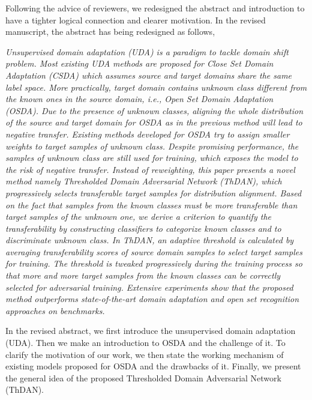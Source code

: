 Following the advice of reviewers, we redesigned the abstract and introduction to have a tighter logical connection and clearer motivation.
In the revised manuscript, the abstract has being redesigned as follows,
\begin{siderules}
    \textit{
        \footnotesize
        Unsupervised domain adaptation (UDA) is a paradigm to tackle domain shift problem.
        Most existing UDA methods are proposed for Close Set Domain Adaptation (\textit{CSDA}) which assumes source and target domains share the same label space.
        More practically, target domain contains unknown class different from the known ones in the source domain, i.e., Open Set Domain Adaptation (\textit{OSDA}).
        Due to the presence of unknown classes, aligning the whole distribution of the source and target domain for OSDA as in the previous method will lead to negative transfer. 
        Existing methods developed for OSDA try to assign smaller weights to target samples of unknown class.
        Despite promising performance, the samples of unknown class are still used for training, which exposes the model to the risk of negative transfer.
        Instead of reweighting, this paper presents a novel method namely Thresholded Domain Adversarial Network (\textit{ThDAN}), which progressively selects transferable target samples for distribution alignment. 
        Based on the fact that samples from the known classes must be more transferable than target samples of the unknown one, we derive a criterion to quantify the transferability by constructing classifiers to categorize known classes and to discriminate unknown class.
        In ThDAN, an adaptive threshold is calculated by averaging transferability scores of source domain samples to select target samples for training. 
        The threshold is tweaked progressively during the training process so that more and more target samples from the known classes can be correctly selected for adversarial training.
        Extensive experiments show that the proposed method outperforms state-of-the-art domain adaptation and open set recognition approaches on benchmarks.
    }
\end{siderules}
In the revised abstract, we first introduce the unsupervised domain adaptation (UDA).
Then we make an introduction to OSDA and the challenge of it.
To clarify the motivation of our work, we then state the working mechanism of existing models proposed for OSDA and the drawbacks of it.
Finally, we present the general idea of the proposed Thresholded Domain Adversarial Network (ThDAN).

